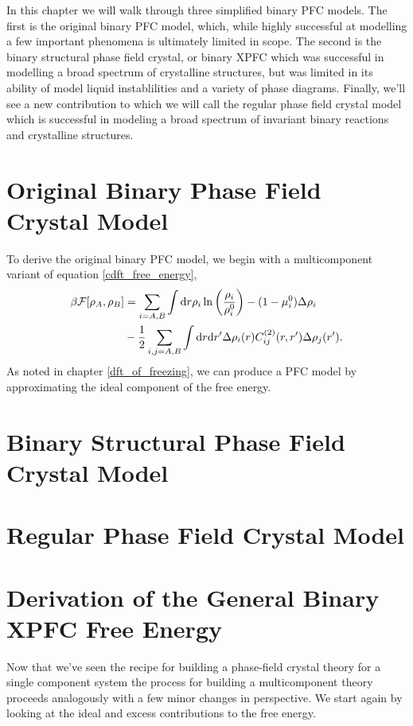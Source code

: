 In this chapter we will walk through three simplified binary PFC models. The
first is the original binary PFC model, which, while highly successful at
modelling a few important phenomena is ultimately limited in scope. The second
is the binary structural phase field crystal, or binary XPFC which was
successful in modelling a broad spectrum of crystalline structures, but was
limited in its ability of model liquid instablilities and a variety of phase
diagrams. Finally, we'll see a new contribution to which we will call the
regular phase field crystal model which is successful in modeling a broad
spectrum of invariant binary reactions and crystalline structures. 

\section{Original Binary Phase Field Crystal Model}

To derive the original binary PFC model, we begin with a multicomponent variant
of equation \ref{cdft_free_energy}, 
%
\begin{align} \beta\mathcal{F}[\rho_A, \rho_B] &= \sum_{i=A, B} \int \mathrm{d}r \rho_i
    \ln\left(\frac{\rho_i}{\rho_i^0}\right) - (1 - \mu_i^0) \Delta\rho_i \\ &- \frac{1}{2}
    \sum_{i,j=A, B} \int \mathrm{d}r \mathrm{d}r^\prime \Delta\rho_i(r)
    C^{(2)}_{ij}(r, r^\prime) \Delta\rho_j(r^\prime).  \end{align}
%
As noted in chapter \ref{dft_of_freezing}, we can produce a PFC model by
approximating the ideal component of the free energy. 

\section{Binary Structural Phase Field Crystal Model}

\section{Regular Phase Field Crystal Model}

\section*{Derivation of the General Binary XPFC Free Energy}

Now that we've seen the recipe for building a phase-field crystal theory for a
single component system the process for building a multicomponent theory
proceeds analogously with a few minor changes in perspective.  We start again
by looking at the ideal and excess contributions to the free energy.

